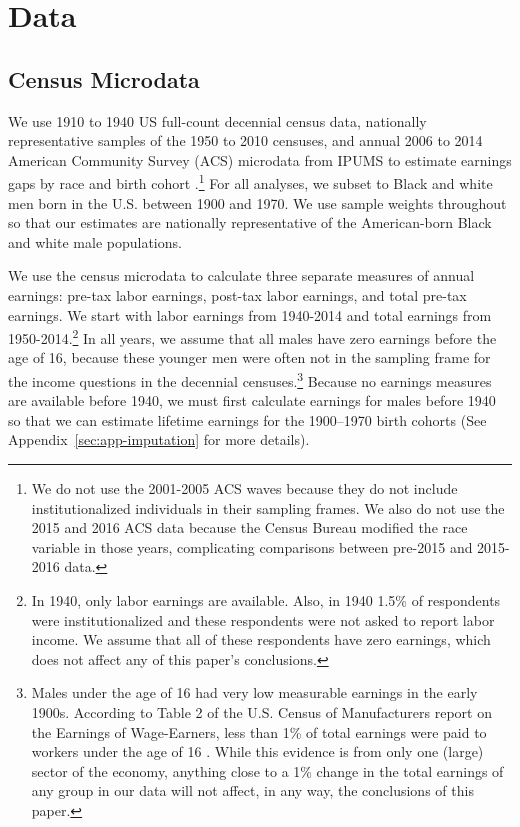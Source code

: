 \documentclass[12pt]{article}
\begin{document}

\section{Data}

\subsection{Census Microdata}

We use 1910 to 1940 US full-count decennial census data, nationally representative samples of the 1950 to 2010 censuses, and annual 2006 to 2014 American Community Survey (ACS) microdata from IPUMS to estimate earnings gaps by race and birth cohort .\footnote{We do not use the 2001-2005 ACS waves because they do not include institutionalized individuals in their sampling frames. 
We also do not use the 2015 and 2016 ACS data because the Census Bureau modified the race variable in those years, complicating comparisons between pre-2015 and 2015-2016 data.} 
For all analyses, we subset to Black and white men born in the U.S. between 1900 and 1970. We use sample weights throughout so that our estimates are nationally representative of the American-born Black and white male populations.

We use the census microdata to calculate three separate measures of annual earnings: pre-tax labor earnings, post-tax labor earnings, and total pre-tax earnings. 
We start with labor earnings from 1940-2014 and total earnings from 1950-2014.\footnote{In 1940, only labor earnings are available. 
Also, in 1940 1.5\% of respondents were institutionalized and these respondents were not asked to report labor income. 
We assume that all of these respondents have zero earnings, which does not affect any of this paper's conclusions.} 
In all years, we assume that all males have zero earnings before the age of 16, because these younger men were often not in the sampling frame for the income questions in the decennial censuses.\footnote{Males under the age of 16 had very low measurable earnings in the early 1900s. 
According to Table 2 of the U.S. Census of Manufacturers report on the Earnings of Wage-Earners, less than 1\% of total earnings were paid to workers under the age of 16 . 
While this evidence is from only one (large) sector of the economy, anything close to a 1\% change in the total earnings of any group in our data will not affect, in any way, the conclusions of this paper.} 
Because no earnings measures are available before 1940, we must first calculate earnings for males before 1940 so that we can estimate lifetime earnings for the 1900--1970 birth cohorts (See Appendix~\ref{sec:app-imputation} for more details). 
\end{document}
